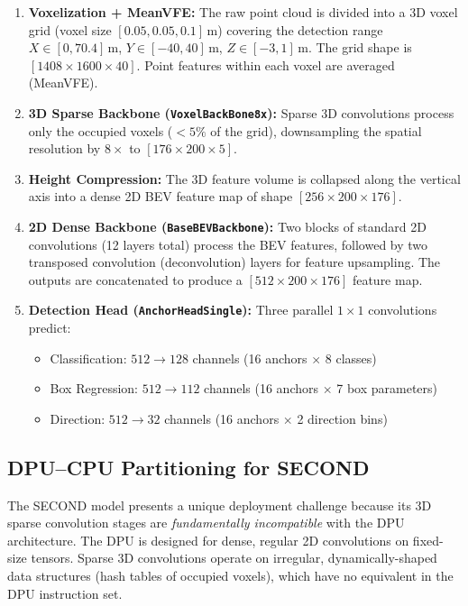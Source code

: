 \documentclass[12pt, a4paper]{report}
\begin{document}
\begin{enumerate}[nosep]
    \item \textbf{Voxelization + MeanVFE:} The raw point cloud is divided into a 3D voxel grid (voxel size $[0.05, 0.05, 0.1]$\,m) covering the detection range $X \in [0, 70.4]$\,m, $Y \in [-40, 40]$\,m, $Z \in [-3, 1]$\,m. The grid shape is $[1408 \times 1600 \times 40]$. Point features within each voxel are averaged (MeanVFE).
    \item \textbf{3D Sparse Backbone (\texttt{VoxelBackBone8x}):} Sparse 3D convolutions process only the occupied voxels ($<5\%$ of the grid), downsampling the spatial resolution by $8\times$ to $[176 \times 200 \times 5]$.
    \item \textbf{Height Compression:} The 3D feature volume is collapsed along the vertical axis into a dense 2D BEV feature map of shape $[256 \times 200 \times 176]$.
    \item \textbf{2D Dense Backbone (\texttt{BaseBEVBackbone}):} Two blocks of standard 2D convolutions (12 layers total) process the BEV features, followed by two transposed convolution (deconvolution) layers for feature upsampling. The outputs are concatenated to produce a $[512 \times 200 \times 176]$ feature map.
    \item \textbf{Detection Head (\texttt{AnchorHeadSingle}):} Three parallel $1\times1$ convolutions predict:
    \begin{itemize}[nosep]
        \item Classification: $512 \to 128$ channels (16 anchors $\times$ 8 classes)
        \item Box Regression: $512 \to 112$ channels (16 anchors $\times$ 7 box parameters)
        \item Direction: $512 \to 32$ channels (16 anchors $\times$ 2 direction bins)
    \end{itemize}
\end{enumerate}

\subsection{DPU--CPU Partitioning for SECOND}
\label{sec:second_partition}

The SECOND model presents a unique deployment challenge because its 3D sparse convolution stages are \textit{fundamentally incompatible} with the DPU architecture. The DPU is designed for dense, regular 2D convolutions on fixed-size tensors. Sparse 3D convolutions operate on irregular, dynamically-shaped data structures (hash tables of occupied voxels), which have no equivalent in the DPU instruction set.
\end{document}
